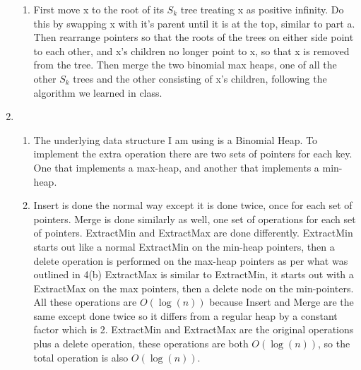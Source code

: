 \documentclass[10pt,a4paper]{article}
\begin{document}
\begin{enumerate}
\begin{enumerate}
\item First move x to the root of its $S_k$ tree treating x as positive infinity. Do this by swapping x with it's parent until it is at the top, similar to part a. Then rearrange pointers so that the roots of the trees on either side point to each other, and x's children no longer point to x, so that x is removed from the tree. Then merge the two binomial max heaps, one of all the other $S_k$ trees and the other consisting of x's children, following the algorithm we learned in class. 
\end{enumerate}
\item
\begin{enumerate}
\item
 The underlying data structure I am using is a Binomial Heap. To implement the extra operation there are two sets of pointers for each key. One that implements a max-heap, and another that implements a min-heap.
 
 \item Insert is done the normal way except it is done twice, once for each set of pointers. Merge is done similarly as well, one set of operations for each set of pointers. ExtractMin and ExtractMax are done differently. ExtractMin starts out like a normal ExtractMin on the min-heap pointers, then a delete operation is performed on the max-heap pointers as per what was outlined in 4(b) ExtractMax is similar to ExtractMin, it starts out with a ExtractMax on the max pointers, then a delete node on the min-pointers. All these operations are $O(\log(n))$ because Insert and Merge are the same except done twice so it differs from a regular heap by a constant factor which is 2. ExtractMin and ExtractMax are the original operations plus a delete operation, these operations are both
 $O(\log(n))$, so the total operation is also 
 $O(\log(n))$. 
 \end{enumerate}
\end{enumerate}
\end{document}
